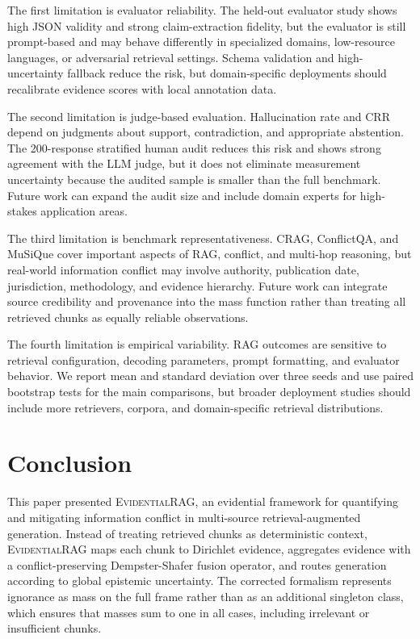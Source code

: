 \documentclass[preprint,12pt,authoryear,nopreprintline]{elsarticle}
\newcommand{\ERAG}{\textsc{EvidentialRAG}}
\begin{document}
The first limitation is evaluator reliability. The held-out evaluator study shows high JSON validity and strong claim-extraction fidelity, but the evaluator is still prompt-based and may behave differently in specialized domains, low-resource languages, or adversarial retrieval settings. Schema validation and high-uncertainty fallback reduce the risk, but domain-specific deployments should recalibrate evidence scores with local annotation data.

The second limitation is judge-based evaluation. Hallucination rate and CRR depend on judgments about support, contradiction, and appropriate abstention. The 200-response stratified human audit reduces this risk and shows strong agreement with the LLM judge, but it does not eliminate measurement uncertainty because the audited sample is smaller than the full benchmark. Future work can expand the audit size and include domain experts for high-stakes application areas.

The third limitation is benchmark representativeness. CRAG, ConflictQA, and MuSiQue cover important aspects of RAG, conflict, and multi-hop reasoning, but real-world information conflict may involve authority, publication date, jurisdiction, methodology, and evidence hierarchy. Future work can integrate source credibility and provenance into the mass function rather than treating all retrieved chunks as equally reliable observations.

The fourth limitation is empirical variability. RAG outcomes are sensitive to retrieval configuration, decoding parameters, prompt formatting, and evaluator behavior. We report mean and standard deviation over three seeds and use paired bootstrap tests for the main comparisons, but broader deployment studies should include more retrievers, corpora, and domain-specific retrieval distributions.

\section{Conclusion}
\label{sec:conclusion}

This paper presented \ERAG{}, an evidential framework for quantifying and mitigating information conflict in multi-source retrieval-augmented generation. Instead of treating retrieved chunks as deterministic context, \ERAG{} maps each chunk to Dirichlet evidence, aggregates evidence with a conflict-preserving Dempster-Shafer fusion operator, and routes generation according to global epistemic uncertainty. The corrected formalism represents ignorance as mass on the full frame rather than as an additional singleton class, which ensures that masses sum to one in all cases, including irrelevant or insufficient chunks.
\end{document}
